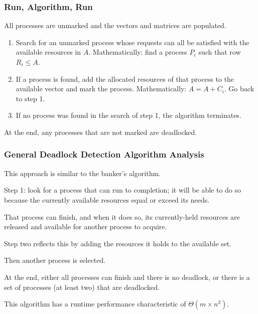 \begin{frame}
\frametitle{Run, Algorithm, Run}

All processes are unmarked and the vectors and matrices are populated. 

\begin{enumerate}
	\item Search for an unmarked process whose requests can all be satisfied with the available resources in $A$. Mathematically: find a process $P_{i}$ such that row $R_{i} \leq A$.
	\item If a process is found, add the allocated resources of that process to the available vector and mark the process. Mathematically: $A = A + C_{i}$. Go back to step 1.
	\item If no process was found in the search of step 1, the algorithm terminates.
\end{enumerate}

At the end, any processes that are not marked are deadlocked.

\end{frame}

\begin{frame}
\frametitle{General Deadlock Detection Algorithm Analysis}

This approach is similar to the banker's algorithm. 

Step 1: look for a process that can run to completion; it will be able to do so because the currently available resources equal or exceed its needs. 

That process can finish, and when it does so, its currently-held resources are released and available for another process to acquire. 

Step two reflects this by adding the resources it holds to the available set. 

Then another process is selected. 

At the end, either all processes can finish and there is no deadlock, or there is a set of processes (at least two) that are deadlocked. 

This algorithm has a runtime performance characteristic of $\Theta(m \times n^{2})$.


\end{frame}

